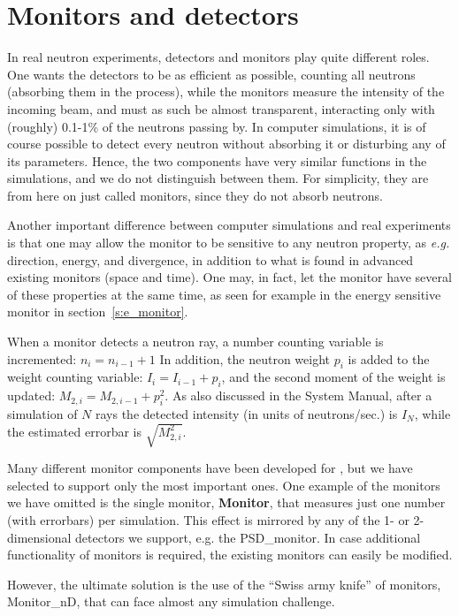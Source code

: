 
\chapter{Monitors and detectors}

In real neutron experiments, detectors and monitors play quite
different roles. One wants the detectors to be as efficient as
possible, counting all neutrons (absorbing them in the process),
while the monitors measure the intensity of the incoming beam, and must
as such be almost transparent, interacting only with (roughly) 0.1-1\%
of the neutrons passing by. In computer simulations, it is
of course possible to detect every neutron without
absorbing it or disturbing any of its parameters. Hence, the two components
have very similar functions in the simulations, and we do
not distinguish between them. For simplicity, they are from here on
just called monitors, since they do not absorb neutrons.

Another important difference between computer simulations
and real experiments is
that one may allow the monitor to be sensitive to any neutron property,
as {\em e.g.} direction, energy, and divergence, in addition to what
is found in advanced existing monitors (space and time). One may, in
fact, let the monitor have several of these properties at the same time,
as seen for example in the energy sensitive monitor in
section~\ref{s:e_monitor}.

When a monitor detects a neutron ray,
a number counting variable is incremented: $n_i = n_{i-1}+1$
In addition, the neutron
weight $p_i$ is added to the weight counting variable:
$I_i = I_{i-1} + p_i$,
and the second moment of the weight is
updated: $M_{2,i} = M_{2,i-1} + p_i^2$.
As also discussed in the System Manual, after a simulation of $N$ rays
the detected intensity (in units of neutrons/sec.) is $I_N$,
while the estimated errorbar is $\sqrt{M_{2,i}^2}$.


Many different monitor components have been developed for
\MCS , but we have selected to support only the most important ones.
One example of the monitors we have omitted is the single monitor,
{\bf Monitor},
that measures just one number (with errorbars) per simulation.
This effect is mirrored by any of the 1- or 2-dimensional detectors
we support, e.g. the {\rm PSD\_monitor}.
In case additional functionality of monitors is required,
the existing monitors can easily be modified.

However, the ultimate solution is the use of the
``Swiss army knife'' of monitors, {\rm Monitor\_nD}, that can face
almost any simulation challenge.

\newpage


\newpage


\newpage


\newpage


\newpage


\newpage


\newpage


%